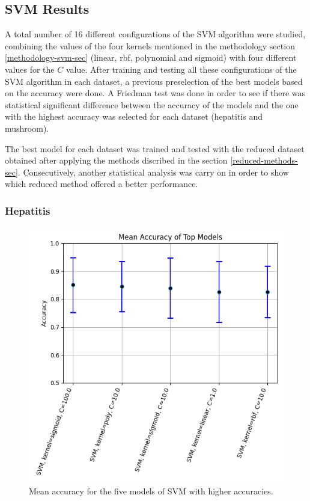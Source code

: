 \subsection{SVM Results}
A total number of 16 different configurations of the SVM algorithm were studied, combining the values of the four kernels mentioned in the methodology section \ref{methodology-svm-sec} (linear, rbf, polynomial and sigmoid) with four different values for the $C$ value. After training and testing all these configurations of the SVM algorithm in each dataset, a previous preselection of the best models based on the accuracy were done. A Friedman test was done in order to see if there was statistical significant difference between the accuracy of the models and the one with the highest accuracy was selected for each dataset (hepatitis and mushroom). 
\newline

The best model for each dataset was trained and tested with the reduced dataset obtained after applying the methods discribed in the section \ref{reduced-methods-sec}. Consecutively, another statistical analysis was carry on in order to show which reduced method offered a better performance. 

\subsubsection{Hepatitis}
\begin{figure}[t]
    \centering
    \includegraphics[width=\textwidth]{figures/svm/hepatitis/statistical_analysis_results.png}
    \caption{Mean accuracy for the five models of SVM with higher accuracies.}
    \label{fig:hep-svm-1}
\end{figure}



